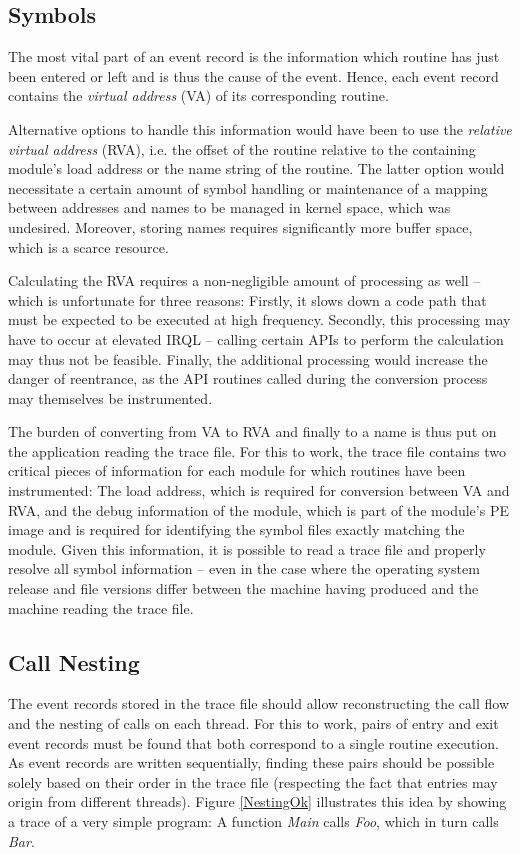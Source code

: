 \subsection{Symbols}
The most vital part of an event record is the information which routine has 
just been entered or left and is thus the cause of the event. Hence, each
event record contains the \emph{virtual address} (VA) of its corresponding routine. 

Alternative options to handle this information would have been to use the 
\emph{relative virtual address} (RVA), i.e. the offset of the routine
relative to the containing module's load address or the name 
string of the routine. The latter option would necessitate a certain 
amount of symbol handling or maintenance of a mapping between addresses 
and names to be managed in kernel space, which was undesired. Moreover,
storing names requires significantly more buffer space, which is a scarce 
resource. 

Calculating the RVA requires a non-negligible amount of processing as well --
which is unfortunate for three reasons: Firstly, it slows down a code path that
must be expected to be executed at high frequency. Secondly, this processing
may have to occur at elevated IRQL -- calling certain APIs to perform the calculation may thus not be feasible. Finally,
the additional processing would increase the danger of reentrance, as the API
routines called during the conversion process may themselves be instrumented.

The burden of converting from VA to RVA and finally to 
a name is thus put on the application reading the trace file. For this to 
work, the trace file contains two critical pieces of information for each
module for which routines have been instrumented: The load address, which
is required for conversion between VA and RVA, and the debug information
of the module, which is part of the module's PE image and is required for
identifying the symbol files exactly matching the module. Given this information,
it is possible to read a trace file and properly resolve all symbol information --
even in the case where the operating system release and file versions differ between
the machine having produced and the machine reading the trace file.

\subsection{Call Nesting}
\label{sec:CallNesting}

The event records stored in the trace file should allow reconstructing the call flow
and the nesting of calls on each thread. For this to work, pairs of entry and exit
event records must be found that both correspond to a single routine execution. 
As event records are written sequentially, finding these pairs should be possible
solely based on their order in the trace file (respecting the fact that entries may
origin from different threads). Figure \ref{NestingOk} illustrates this idea by 
showing a trace of a very simple program: A function \emph{Main} calls \emph{Foo},
which in turn calls \emph{Bar}.

